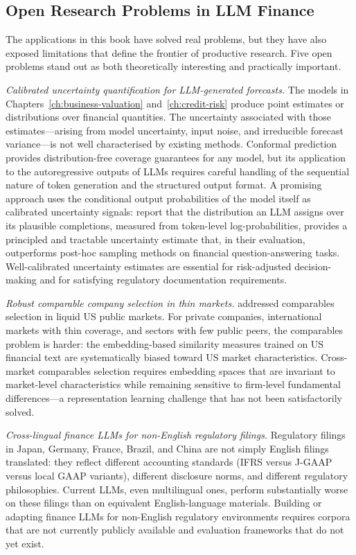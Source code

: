 \begin{context}
\subsection{Open Research Problems in LLM Finance}
\label{subsec:af-future-research}

The applications in this book have solved real problems, but they have also exposed limitations that define the frontier of productive research. Five open problems stand out as both theoretically interesting and practically important.

\emph{Calibrated uncertainty quantification for LLM-generated forecasts.} The models in Chapters~\ref{ch:business-valuation} and~\ref{ch:credit-risk} produce point estimates or distributions over financial quantities. The uncertainty associated with those estimates---arising from model uncertainty, input noise, and irreducible forecast variance---is not well characterised by existing methods. Conformal prediction provides distribution-free coverage guarantees for any model, but its application to the autoregressive outputs of LLMs requires careful handling of the sequential nature of token generation and the structured output format. A promising approach uses the conditional output probabilities of the model itself as calibrated uncertainty signals: \citet{chen2024uncertainty} report that the distribution an LLM assigns over its plausible completions, measured from token-level log-probabilities, provides a principled and tractable uncertainty estimate that, in their evaluation, outperforms post-hoc sampling methods on financial question-answering tasks. Well-calibrated uncertainty estimates are essential for risk-adjusted decision-making and for satisfying regulatory documentation requirements.

\emph{Robust comparable company selection in thin markets.}  addressed comparables selection in liquid US public markets. For private companies, international markets with thin coverage, and sectors with few public peers, the comparables problem is harder: the embedding-based similarity measures trained on US financial text are systematically biased toward US market characteristics. Cross-market comparables selection requires embedding spaces that are invariant to market-level characteristics while remaining sensitive to firm-level fundamental differences---a representation learning challenge that has not been satisfactorily solved.

\emph{Cross-lingual finance LLMs for non-English regulatory filings.} Regulatory filings in Japan, Germany, France, Brazil, and China are not simply English filings translated: they reflect different accounting standards (IFRS versus J-GAAP versus local GAAP variants), different disclosure norms, and different regulatory philosophies. Current LLMs, even multilingual ones, perform substantially worse on these filings than on equivalent English-language materials. Building or adapting finance LLMs for non-English regulatory environments requires corpora that are not currently publicly available and evaluation frameworks that do not yet exist.


\end{context}
